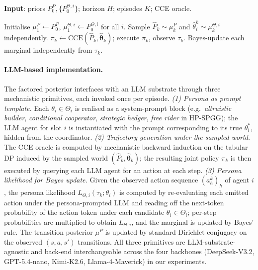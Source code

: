 ﻿\documentclass{article}
\begin{document}
\begin{algorithm}[t]
\caption{H-PSMG}\label{alg:hpsmg}
\textbf{Input}: priors $P_0^P, \{P_0^{\Theta,i}\}$; horizon $H$; episodes $K$; CCE oracle.\\
\begin{algorithmic}[1]
\STATE Initialise $\mu_1^P\!\gets\! P_0^P$, $\mu_1^{\Theta,i}\!\gets\! P_0^{\Theta,i}$ for all $i$.
  \STATE Sample $\hat P_k\!\sim\!\mu_k^P$ and $\hat\theta_i^k\!\sim\!\mu_k^{\Theta,i}$ independently.
  \STATE $\pi_k\gets\mathrm{CCE}(\hat P_k,\hat{\boldsymbol\theta}_k)$; execute $\pi_k$, observe $\tau_k$.
  \STATE Bayes-update each marginal independently from $\tau_k$.
\ENDFOR
\end{algorithmic}
\end{algorithm}

\paragraph{LLM-based implementation.} The factored posterior interfaces with an LLM substrate through three mechanistic primitives, each invoked once per episode. \emph{(1) Persona as prompt template.} Each $\theta_i\!\in\!\Theta_i$ is realised as a system-prompt block (e.g.\ \emph{altruistic builder}, \emph{conditional cooperator}, \emph{strategic hedger}, \emph{free rider} in HP-SPGG); the LLM agent for slot $i$ is instantiated with the prompt corresponding to its true $\theta_i^*$, hidden from the coordinator. \emph{(2) Trajectory generation under the sampled world.} The CCE oracle is computed by mechanistic backward induction on the tabular DP induced by the sampled world $(\hat P_k, \hat{\boldsymbol\theta}_k)$; the resulting joint policy $\pi_k$ is then executed by querying each LLM agent for an action at each step. \emph{(3) Persona likelihood for Bayes update.} Given the observed action sequence $(a_h^k)_h$ of agent $i$, the persona likelihood $L_{\Theta,i}(\tau_k;\theta_i)$ is computed by re-evaluating each emitted action under the persona-prompted LLM and reading off the next-token probability of the action token under each candidate $\theta_i\!\in\!\Theta_i$; per-step probabilities are multiplied to obtain $L_{\Theta,i}$, and the marginal is updated by Bayes' rule. The transition posterior $\mu^P$ is updated by standard Dirichlet conjugacy on the observed $(s, a, s')$ transitions. All three primitives are LLM-substrate-agnostic and back-end interchangeable across the four backbones (DeepSeek-V3.2, GPT-5.4-nano, Kimi-K2.6, Llama-4-Maverick) in our experiments.
\end{document}
